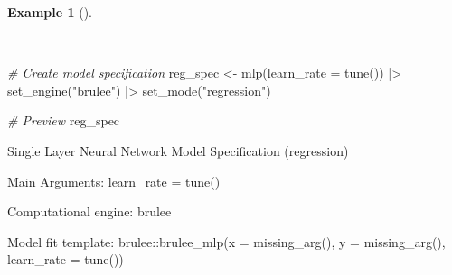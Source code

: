 \documentclass[
  letterpaper,
]{latex/krantz}
\newenvironment{Shaded}{\begin{snugshade}}{\end{snugshade}}
\newcommand{\AttributeTok}[1]{\textcolor[rgb]{0.00,0.00,0.00}{#1}}
\newcommand{\CommentTok}[1]{\textcolor[rgb]{0.00,0.00,0.00}{\textit{#1}}}
\newcommand{\FunctionTok}[1]{\textcolor[rgb]{0.00,0.00,0.00}{#1}}
\newcommand{\NormalTok}[1]{\textcolor[rgb]{0.00,0.00,0.00}{#1}}
\newcommand{\OtherTok}[1]{\textcolor[rgb]{0.00,0.00,0.00}{#1}}
\newcommand{\SpecialCharTok}[1]{\textcolor[rgb]{0.00,0.00,0.00}{#1}}
\newcommand{\StringTok}[1]{\textcolor[rgb]{0.00,0.00,0.00}{#1}}
\theoremstyle{definition}
\newtheorem{example}{Example}[chapter]
\theoremstyle{remark}
\begin{document}
\begin{example}[]\protect\hypertarget{exm-pda-reg-model-spec-mlp}{}\label{exm-pda-reg-model-spec-mlp}

~

\begin{Shaded}
\begin{Highlighting}[]
\CommentTok{\# Create model specification}
\NormalTok{reg\_spec }\OtherTok{\textless{}{-}}
  \FunctionTok{mlp}\NormalTok{(}\AttributeTok{learn\_rate =} \FunctionTok{tune}\NormalTok{()) }\SpecialCharTok{|\textgreater{}}
  \FunctionTok{set\_engine}\NormalTok{(}\StringTok{"brulee"}\NormalTok{) }\SpecialCharTok{|\textgreater{}}
  \FunctionTok{set\_mode}\NormalTok{(}\StringTok{"regression"}\NormalTok{)}

\CommentTok{\# Preview}
\NormalTok{reg\_spec}
\end{Highlighting}
\end{Shaded}

\begin{Shaded}
\begin{Highlighting}[]
\NormalTok{Single Layer Neural Network Model Specification (regression)}

\NormalTok{Main Arguments:}
\NormalTok{  learn\_rate = tune()}

\NormalTok{Computational engine: brulee}

\NormalTok{Model fit template:}
\NormalTok{brulee::brulee\_mlp(x = missing\_arg(), y = missing\_arg(), learn\_rate = tune())}
\end{Highlighting}
\end{Shaded}

\end{example}
\end{document}
